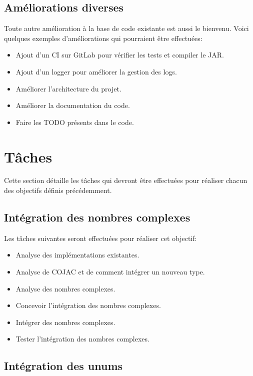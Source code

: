 \subsection{Améliorations diverses}

Toute autre amélioration à la base de code existante est aussi le bienvenu. Voici quelques exemples d'améliorations qui pourraient être effectuées:
\begin{itemize}
    \item Ajout d'un CI sur GitLab pour vérifier les tests et compiler le JAR.
    \item Ajout d'un logger pour améliorer la gestion des logs.
    \item Améliorer l'architecture du projet.
    \item Améliorer la documentation du code.
    \item Faire les TODO présents dans le code.
\end{itemize}

\section{Tâches}

Cette section détaille les tâches qui devront être effectuées pour réaliser chacun des objectifs définis précédemment.

\subsection{Intégration des nombres complexes}

Les tâches suivantes seront effectuées pour réaliser cet objectif:
\begin{itemize}
    \item Analyse des implémentations existantes.
    \item Analyse de COJAC et de comment intégrer un nouveau type.
    \item Analyse des nombres complexes.
    \item Concevoir l'intégration des nombres complexes.
    \item Intégrer des nombres complexes.
    \item Tester l'intégration des nombres complexes.
\end{itemize}

\subsection{Intégration des unums}

